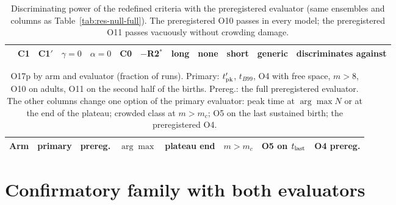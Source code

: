 \documentclass[pre,onecolumn,superscriptaddress,notitlepage]{revtex4-2}
\begin{document}
\begin{table}[ht]
\centering
\caption{Discriminating power of the redefined criteria with the preregistered evaluator (same ensembles and columns
as Table~\ref{tab:res-null-full}). The preregistered O10 passes in every model; the preregistered O11 passes
vacuously without crowding damage.}
\label{tab:res-null-v1}
\footnotesize
\setlength{\tabcolsep}{3.2pt}
\begin{tabular}{@{}lccccccccccl@{}}
\toprule
& \textsf{C1} & \textsf{C1}$'$ & $\gamma{=}0$ & $\alpha{=}0$ & \textsf{C0} & $-$R2$^*$ & long & none & short & generic & discriminates against \\
\midrule

\end{tabular}
\end{table}

\begin{table}[ht]
\centering
\caption{O17p by arm and evaluator (fraction of runs). Primary: $t'_{\rm pk}$, $t_{B99}$, O4 with free space,
$m>8$, O10 on adults, O11 on the second half of the births. Prereg.: the full preregistered evaluator. The other columns
change one option of the primary evaluator: peak time at $\arg\max N$ or at the end of the plateau; crowded class
at $m>m_c$; O5 on the last sustained birth; the preregistered O4.}
\label{tab:res-rescoring}
\footnotesize
\setlength{\tabcolsep}{4pt}
\begin{tabular}{@{}lccccccc@{}}
\toprule
Arm & primary & prereg. & $\arg\max$ & plateau end & $m>m_c$ & O5 on $t_{\rm last}$ & O4 prereg. \\
\midrule

\end{tabular}
\end{table}

\section{Confirmatory family with both evaluators}
\label{supp:Q}
\end{document}
